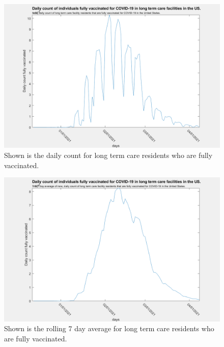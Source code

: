 \documentclass[twoside]{article}
\begin{document}
\begin{multicols}{2}
\begin{figure}[H]
	\includegraphics[width=\linewidth]{images/usa_daily_ltc_fully_vaccinated_unprocessed.png}
	\caption{Shown is the daily count for long term care residents who are fully vaccinated.}
	\label{fig:images/usa_daily_ltc_fully_vaccinated_unprocessedLabel}
\end{figure}

\begin{figure}[H]
	\includegraphics[width=\linewidth]{images/usa_daily_ltc_fully_vaccinated_processed.png}
	\caption{Shown is the rolling 7 day average for long term care residents who are fully vaccinated. }
	\label{fig:images/usa_daily_ltc_fully_vaccinated_processedLabel}
\end{figure}


\end{multicols}
\end{document}
